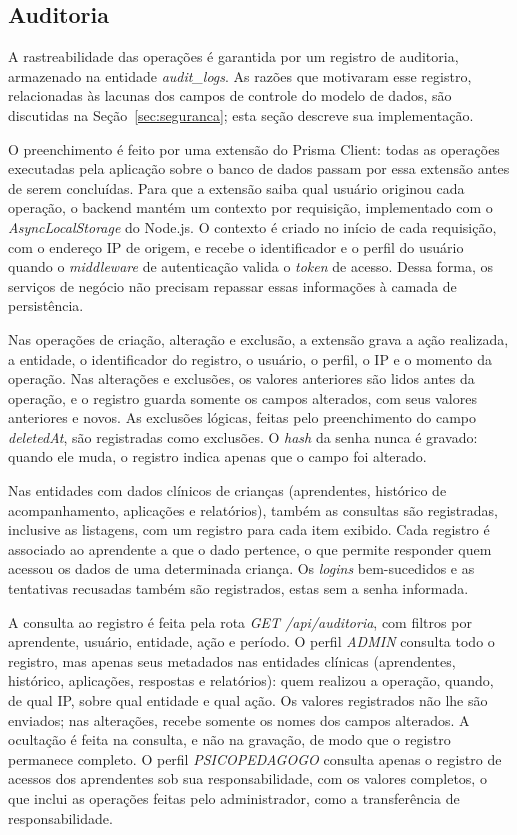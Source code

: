 \subsection{Auditoria}\label{sec:auditoria}

A rastreabilidade das operações é garantida por um registro de auditoria, armazenado na entidade \textit{audit\_logs}. As razões que motivaram esse registro, relacionadas às lacunas dos campos de controle do modelo de dados, são discutidas na Seção~\ref{sec:seguranca}; esta seção descreve sua implementação.

O preenchimento é feito por uma extensão do Prisma Client: todas as operações executadas pela aplicação sobre o banco de dados passam por essa extensão antes de serem concluídas. Para que a extensão saiba qual usuário originou cada operação, o backend mantém um contexto por requisição, implementado com o \textit{AsyncLocalStorage} do Node.js. O contexto é criado no início de cada requisição, com o endereço IP de origem, e recebe o identificador e o perfil do usuário quando o \textit{middleware} de autenticação valida o \textit{token} de acesso. Dessa forma, os serviços de negócio não precisam repassar essas informações à camada de persistência.

Nas operações de criação, alteração e exclusão, a extensão grava a ação realizada, a entidade, o identificador do registro, o usuário, o perfil, o IP e o momento da operação. Nas alterações e exclusões, os valores anteriores são lidos antes da operação, e o registro guarda somente os campos alterados, com seus valores anteriores e novos. As exclusões lógicas, feitas pelo preenchimento do campo \textit{deletedAt}, são registradas como exclusões. O \textit{hash} da senha nunca é gravado: quando ele muda, o registro indica apenas que o campo foi alterado.

Nas entidades com dados clínicos de crianças (aprendentes, histórico de acompanhamento, aplicações e relatórios), também as consultas são registradas, inclusive as listagens, com um registro para cada item exibido. Cada registro é associado ao aprendente a que o dado pertence, o que permite responder quem acessou os dados de uma determinada criança. Os \textit{logins} bem-sucedidos e as tentativas recusadas também são registrados, estas sem a senha informada.

A consulta ao registro é feita pela rota \textit{GET /api/auditoria}, com filtros por aprendente, usuário, entidade, ação e período. O perfil \textit{ADMIN} consulta todo o registro, mas apenas seus metadados nas entidades clínicas (aprendentes, histórico, aplicações, respostas e relatórios): quem realizou a operação, quando, de qual IP, sobre qual entidade e qual ação. Os valores registrados não lhe são enviados; nas alterações, recebe somente os nomes dos campos alterados. A ocultação é feita na consulta, e não na gravação, de modo que o registro permanece completo. O perfil \textit{PSICOPEDAGOGO} consulta apenas o registro de acessos dos aprendentes sob sua responsabilidade, com os valores completos, o que inclui as operações feitas pelo administrador, como a transferência de responsabilidade.

